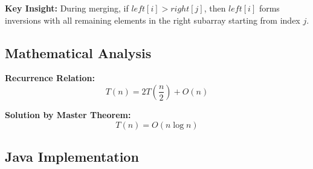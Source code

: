 \documentclass[12pt,a4paper]{article}
\begin{document}
\textbf{Key Insight:} During merging, if $left[i] > right[j]$, then $left[i]$ forms inversions with all remaining elements in the right subarray starting from index $j$.

\subsection{Mathematical Analysis}

\textbf{Recurrence Relation:}
\[
T(n) = 2T\left(\frac{n}{2}\right) + O(n)
\]

\textbf{Solution by Master Theorem:}
\[
T(n) = O(n \log n)
\]

\subsection{Java Implementation}
\end{document}
